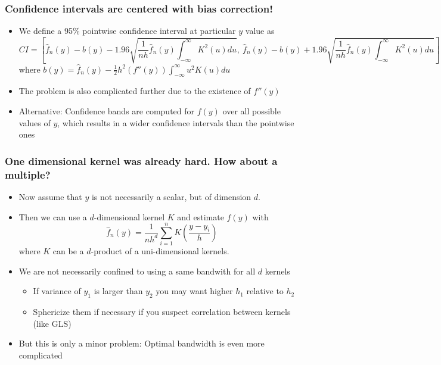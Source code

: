 \documentclass[aspectratio=169]{beamer}
\begin{document}
\begin{frame}
\frametitle{Confidence intervals are centered with bias correction!}
\begin{itemize}
\item We define a 95\% pointwise confidence interval at particular $y$ value as
\small{\[
CI = \left[\hat{f}_n(y)-b(y)-1.96\sqrt{\frac{1}{nh}\hat{f}_n(y) \int_{-\infty}^\infty K^2(u)du},\ \hat{f}_n(y)-b(y)+1.96\sqrt{\frac{1}{nh}\hat{f}_n(y) \int_{-\infty}^\infty K^2(u)du}\right]
\]}\normalsize
where $b(y)=\hat{f}_n(y)-\frac{1}{2}h^2(f''(y))\int_{-\infty}^\infty u^2K(u)du$
\item The problem is also complicated further due to the existence of $f''(y)$
\item Alternative: Confidence bands are computed for $f(y)$ over all possible values of $y$, which results in a wider confidence intervals than the pointwise ones
\end{itemize}
\end{frame}

\begin{frame}
\frametitle{One dimensional kernel was already hard. How about a multiple?}
\begin{itemize}
\item  Now assume that $y$ is not necessarily a scalar, but of dimension $d$. 
\item Then we can use a $d$-dimensional kernel $K$ and estimate $f(y)$ with
 \[
 \hat{f}_n(y)= \frac{1}{nh^d}\sum_{i=1}^nK\left(\frac{y-y_i}{h}\right)
 \]
 where $K$ can be a $d$-product of a uni-dimensional kernels.
 \item  We are not necessarily confined to using a same bandwith for all $d$ kernels 
 \begin{itemize}
 \item If variance of $y_1$ is larger than $y_2$ you may want higher $h_1$ relative to $h_2$
 \item Sphericize them if necessary if you suspect correlation between kernels (like GLS)
 \end{itemize}
 \item But this is only a minor problem: Optimal bandwidth is even more complicated
\end{itemize}
\end{frame}
\end{document}

